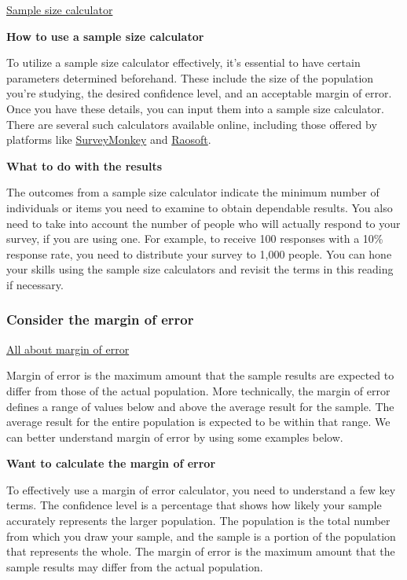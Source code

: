 \documentclass[]{article}
\begin{document}
\uline{Sample size calculator} \par

\textbf{How to use a sample size calculator}

To utilize a sample size calculator effectively, it’s essential to have certain parameters determined beforehand. These include the size of the population you’re studying, the desired confidence level, and an acceptable margin of error. Once you have these details, you can input them into a sample size calculator. There are several such calculators available online, including those offered by platforms like \href{https://surveymonkey.com}{SurveyMonkey} and \href{https://raosoft.com}{Raosoft}.

\textbf{What to do with the results}

The outcomes from a sample size calculator indicate the minimum number of individuals or items you need to examine to obtain dependable results. You also need to take into account the number of people who will actually respond to your survey, if you are using one. For example, to receive 100 responses with a 10\% response rate, you need to distribute your survey to 1,000 people. You can hone your skills using the sample size calculators and revisit the terms in this reading if necessary.

\subsubsection{Consider the margin of error}

\uline{All about margin of error}

Margin of error is the maximum amount that the sample results are expected to differ from those of the actual population. More technically, the margin of error defines a range of values below and above the average result for the sample. The average result for the entire population is expected to be within that range. We can better understand margin of error by using some examples below.

\textbf{Want to calculate the margin of error}

To effectively use a margin of error calculator, you need to understand a few key terms. The confidence level is a percentage that shows how likely your sample accurately represents the larger population. The population is the total number from which you draw your sample, and the sample is a portion of the population that represents the whole. The margin of error is the maximum amount that the sample results may differ from the actual population.
\end{document}
